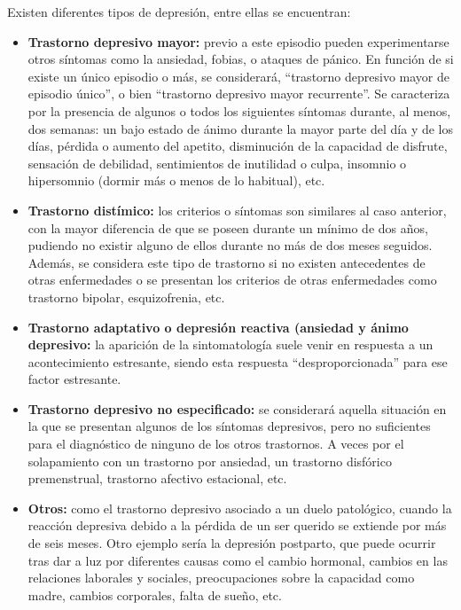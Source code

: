 \documentclass[12pt, a4paper,twoside,titlepage]{book}
\begin{document}
\begin{itemize}
{     
     Existen diferentes tipos de depresión, entre ellas se encuentran: 
         \begin{itemize}
            \item {\textbf{Trastorno depresivo mayor:} previo a este episodio pueden experimentarse otros síntomas como la ansiedad, fobias, o ataques de pánico. En función de si existe un único episodio o más, se considerará, ``trastorno depresivo mayor de episodio único'', o bien ``trastorno depresivo mayor recurrente''. Se caracteriza por la presencia de algunos o todos los siguientes síntomas durante, al menos, dos semanas:  un bajo estado de ánimo durante la mayor parte del día y de los días, pérdida o aumento del apetito, disminución de la capacidad de disfrute, sensación de debilidad, sentimientos de inutilidad o culpa, insomnio o hipersomnio (dormir más o menos de lo habitual), etc. }
            \item {\textbf{Trastorno distímico:} los criterios o síntomas son similares al caso anterior, con la mayor diferencia de que se poseen durante un mínimo de dos años, pudiendo no existir alguno de ellos durante no más de dos meses seguidos. Además, se considera este tipo de trastorno si no existen antecedentes de otras enfermedades o se presentan los criterios de otras enfermedades como trastorno bipolar, esquizofrenia, etc.}
            \item {\textbf{Trastorno adaptativo o depresión reactiva (ansiedad y ánimo depresivo:} la aparición de la sintomatología suele venir en respuesta a un acontecimiento estresante, siendo esta respuesta “desproporcionada” para ese factor estresante. }    
             \item {\textbf{Trastorno depresivo no especificado: }  se considerará aquella situación en la que se presentan algunos de los síntomas depresivos, pero no suficientes para el diagnóstico de ninguno de los otros trastornos. A veces por el solapamiento con un trastorno por ansiedad, un trastorno disfórico premenstrual, trastorno afectivo estacional, etc. }
             \item {\textbf{Otros:}  como el trastorno depresivo asociado a un duelo patológico, cuando la reacción depresiva debido a la pérdida de un ser querido se extiende por más de seis meses. Otro ejemplo sería la depresión postparto, que puede ocurrir tras dar a luz por diferentes causas como el cambio hormonal, cambios en las relaciones laborales y sociales, preocupaciones sobre la capacidad como madre, cambios corporales, falta de sueño, etc. }
        \end{itemize}
}
\end{itemize}
\end{document}

